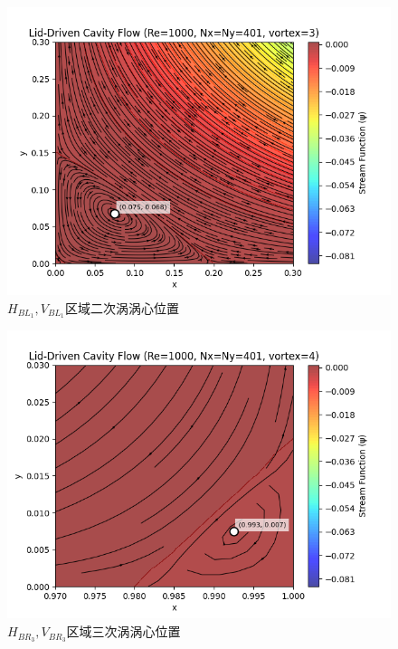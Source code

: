 \documentclass[12pt, a4paper]{article}
\begin{document}
\begin{figure}[htbp]
    \centering
    \includegraphics[width=\textwidth]{pictures/streamline_vortex_3.png}
    \caption{$H_{BL_{1}},V_{BL_{1}}$区域二次涡涡心位置}
\end{figure}

\begin{figure}[htbp]
    \centering
    \includegraphics[width=\textwidth]{pictures/streamline_vortex_4.png}
    \caption{$H_{BR_{3}},V_{BR_{3}}$区域三次涡涡心位置}
\end{figure}
\end{document}
